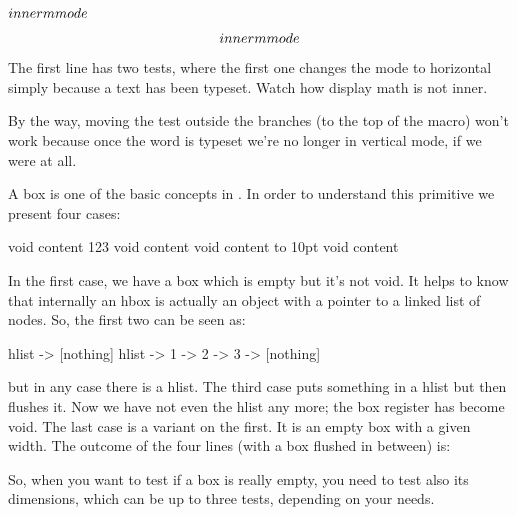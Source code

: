 \typebuffer[option=TEX] \getbuffer

\startbuffer
\ShowMode \ShowMode

\vbox{\ShowMode}

\hbox{\ShowMode}

$\ShowMode$

$$\ShowMode$$
\stopbuffer

\typebuffer[option=TEX]

The first line has two tests, where the first one changes the mode to horizontal
simply because a text has been typeset. Watch how display math is not inner.

\startpacked
\startlines
\getbuffer
\stoplines
\stoppacked

By the way, moving the \type {\ifinner} test outside the branches (to the top of
the macro) won't work because once the word  is typeset we're no
longer in vertical mode, if we were at all.

\stopsubsection

\startsubsection[title={\tex{ifvoid}}]

A box is one of the basic concepts in \TEX. In order to understand this primitive
we present four cases:

\startbuffer
{}\hbox{}          void \else content \fi
{}\hbox{123}       void \else content \fi
{}\hbox{}     void \else content \fi
{}\hbox to 10pt{}  void \else content \fi
\stopbuffer

\typebuffer[option=TEX]

In the first case, we have a box which is empty but it's not void. It helps to
know that internally an hbox is actually an object with a pointer to a linked
list of nodes. So, the first two can be seen as:

\starttyping
hlist -> [nothing]
hlist -> 1 -> 2 -> 3 -> [nothing]
\stoptyping

but in any case there is a hlist. The third case puts something in a hlist but
then flushes it. Now we have not even the hlist any more; the box register has
become void. The last case is a variant on the first. It is an empty box with a
given width. The outcome of the four lines (with a box flushed in between) is:

\startlines
\getbuffer
\stoplines

So, when you want to test if a box is really empty, you need to test also its
dimensions, which can be up to three tests, depending on your needs.

